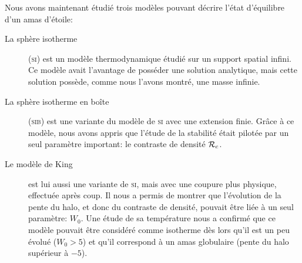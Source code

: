 Nous avons maintenant étudié trois modèles pouvant décrire l'état d'équilibre d'un amas d'étoile:
\begin{description}
	\item[La sphère isotherme] (\textsc{si}) est un modèle thermodynamique étudié sur un support spatial infini. Ce modèle avait l'avantage de posséder une solution analytique,
		mais cette solution possède, comme nous l'avons montré, une masse infinie.
	\item[La sphère isotherme en boîte] (\textsc{sib}) est une variante du modèle de \textsc{si} avec une extension
		finie. Grâce à ce modèle, nous avons appris que l'étude de la stabilité était pilotée par un seul paramètre important:
		le contraste de densité $\mathcal{R}_c$.
	\item[Le modèle de King] est lui aussi une variante de \textsc{si}, mais avec une coupure plus physique, effectuée après coup. Il nous a permis de montrer que l'évolution
		de la pente du halo, et donc du contraste de densité, pouvait être liée à un seul paramètre: $W_0$.
		Une étude de sa température nous a confirmé que ce modèle pouvait être considéré comme isotherme dès lors qu'il est un peu évolué
		($W_0 > 5$) et qu'il correspond à un amas globulaire (pente du halo supérieur à $-5$).
\end{description}
